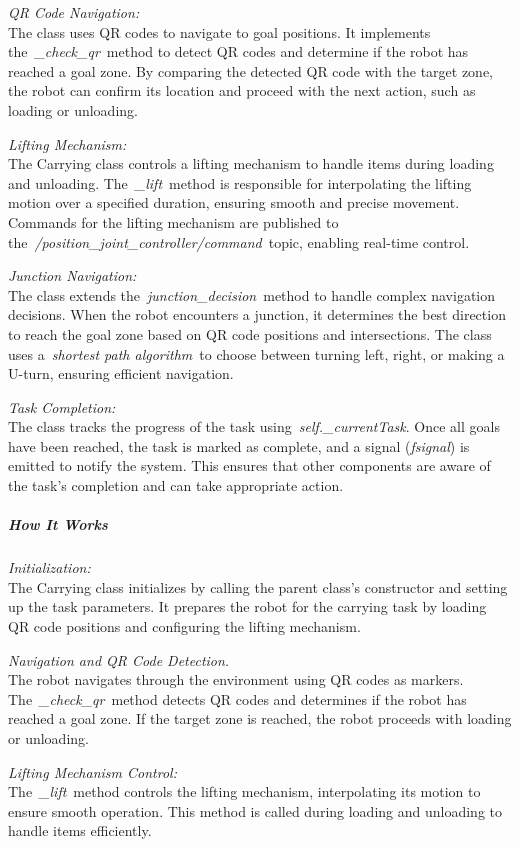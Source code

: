 \documentclass[../../main]{subfiles}
\begin{document}
\emph{QR Code Navigation:}\\
The class uses QR codes to navigate to goal positions. It implements
the~\emph{\_check\_qr}~method to detect QR codes and determine if the
robot has reached a goal zone. By comparing the detected QR code with
the target zone, the robot can confirm its location and proceed with the
next action, such as loading or unloading.

\emph{Lifting Mechanism:}\\
The Carrying class controls a lifting mechanism to handle items during
loading and unloading. The~\emph{\_lift}~method is responsible for
interpolating the lifting motion over a specified duration, ensuring
smooth and precise movement. Commands for the lifting mechanism are
published to the~\emph{/position\_joint\_controller/command}~topic,
enabling real-time control.

\emph{Junction Navigation:}\\
The class extends the~\emph{junction\_decision}~method to handle complex
navigation decisions. When the robot encounters a junction, it
determines the best direction to reach the goal zone based on QR code
positions and intersections. The class uses a~\emph{shortest path
algorithm}~to choose between turning left, right, or making a U-turn,
ensuring efficient navigation.

\emph{Task Completion:}\\
The class tracks the progress of the task
using~\emph{self.\_currentTask}. Once all goals have been reached, the
task is marked as complete, and a signal (\emph{fsignal}) is emitted to
notify the system. This ensures that other components are aware of the
task's completion and can take appropriate action.

\subparagraph{How It Works}
\emph{Initialization:}\\
The Carrying class initializes by calling the parent class's constructor
and setting up the task parameters. It prepares the robot for the
carrying task by loading QR code positions and configuring the lifting
mechanism.

\emph{Navigation and QR Code Detection.}\\
The robot navigates through the environment using QR codes as markers.
The~\emph{\_check\_qr}~method detects QR codes and determines if the
robot has reached a goal zone. If the target zone is reached, the robot
proceeds with loading or unloading.

\emph{Lifting Mechanism Control:}\\
The~\emph{\_lift}~method controls the lifting mechanism, interpolating
its motion to ensure smooth operation. This method is called during
loading and unloading to handle items efficiently.
\end{document}

